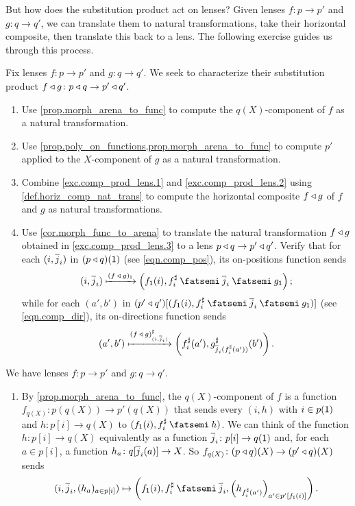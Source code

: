 \documentclass[Book-Poly]{subfiles}
\begin{document}
But how does the substitution product act on lenses?
Given lenses $f\colon p\to p'$ and $g\colon q\to q'$, we can translate them to natural transformations, take their horizontal composite, then translate this back to a lens.
The following exercise guides us through this process.

\begin{exercise} \label{exc.comp_prod_lens}
Fix lenses $f\colon p\to p'$ and $g\colon q\to q'$.
We seek to characterize their substitution product $f\mathbin{\triangleleft} g\colon p\mathbin{\triangleleft} q\to p'\mathbin{\triangleleft} q'$.
\begin{enumerate}
    \item\label{exc.comp_prod_lens.1} Use \cref{prop.morph_arena_to_func} to compute the $q(X)$-component of $f$ as a natural transformation.
    \item\label{exc.comp_prod_lens.2} Use \cref{prop.poly_on_functions,prop.morph_arena_to_func} to compute $p'$ applied to the $X$-component of $g$ as a natural transformation.
    \item\label{exc.comp_prod_lens.3} Combine \cref{exc.comp_prod_lens.1} and \cref{exc.comp_prod_lens.2} using \cref{def.horiz_comp_nat_trans} to compute the horizontal composite $f\mathbin{\triangleleft} g$ of $f$ and $g$ as natural transformations.
    \item Use \cref{cor.morph_func_to_arena} to translate the natural transformation $f\mathbin{\triangleleft} g$ obtained in \cref{exc.comp_prod_lens.3} to a lens $p\mathbin{\triangleleft} q\to p'\mathbin{\triangleleft} q'$.
    Verify that for each $(i,\overline{j}_i)$ in $(p\mathbin{\triangleleft} q)(\textsf{1})$ (see \eqref{eqn.comp_pos}), its on-positions function sends
    \begin{equation} \label{eqn.comp_lens_pos}
        (i,\ol{j}_i)\Mapsto{(f\:\tri\:g)_\1}\left(f_\1(i), f^\sharp_i\then\ol{j}_i\then g_\1\right);
    \end{equation}
    while for each $(a',b')$ in $(p'\tri q')[(f_\1(i), f^\sharp_i\then\ol{j}_i\then g_\1)]$ (see \eqref{eqn.comp_dir}), its on-directions function sends
    \begin{equation} \label{eqn.comp_lens_dir}
        (a',b')\xmapsto{(f\:\mathbin{\triangleleft}\:g)^\sharp_{(i,\overline{j}_i)}}\left(f^\sharp_i(a'), g^\sharp_{\overline{j}_i(f^\sharp_i(a'))}(b')\right).
    \end{equation}
    \qedhere
\end{enumerate}
\begin{solution}
We have lenses $f\colon p\to p'$ and $g\colon q\to q'$.
\begin{enumerate}
    \item By \cref{prop.morph_arena_to_func}, the $q(X)$-component of $f$ is a function $f_{q(X)}\colon p(q(X))\to p'(q(X))$ that sends every $(i,h)$ with $i\in p(\textsf{1})$ and $h\colon p[i]\to q(X)$ to $(f_\1(i),f^\sharp_i\then h)$.
    We can think of the function $h\colon p[i]\to q(X)$ equivalently as a function $\overline{j}_i\colon p[i]\to q(\textsf{1})$ and, for each $a\in p[i]$, a function $h_a\colon q[\overline{j}_i(a)]\to X$.
    So $f_{q(X)}\colon (p\mathbin{\triangleleft} q)(X)\to (p'\mathbin{\triangleleft} q)(X)$ sends \[(i,\ol{j}_i,(h_a)_{a\in p[i]})\mapsto\left(f_\1(i),f^\sharp_i\then\ol{j}_i,\left(h_{f^\sharp_i(a')}\right)_{a'\in p'[f_\1(i)]}\right).\]


\end{enumerate}
\end{solution}
\end{exercise}
\end{document}
